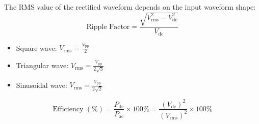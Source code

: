 The RMS value of the rectified waveform depends on the input waveform shape:
\begin{equation}
  \text{Ripple Factor} = \frac{\sqrt{V_{\text{rms}}^2 - V_{\text{dc}}^2}}{V_{\text{dc}}}
  \label{eq:ripple-factor}
\end{equation}
\begin{itemize}
  \item Square wave: $V_{\text{rms}} = \frac{V_{\text{pp}}}{2}$
  \item Triangular wave: $V_{\text{rms}} = \frac{V_{\text{pp}}}{2\sqrt{3}}$
  \item Sinusoidal wave: $V_{\text{rms}} = \frac{V_{\text{pp}}}{2\sqrt{2}}$
\end{itemize}
\begin{equation}
  \text{Efficiency } (\%) = \frac{P_{\text{dc}}}{P_{\text{ac}}} \times 100\% = \frac{(V_{\text{dc}})^2}{(V_{\text{rms}})^2} \times 100\%
  \label{eq:efficiency}
\end{equation}
